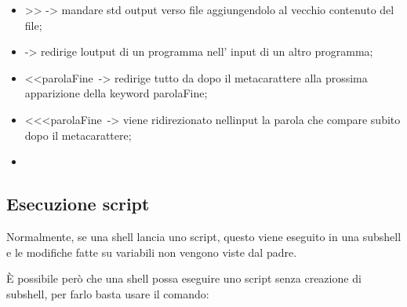 \documentclass[
]{article}
\providecommand{\tightlist}{%
  \setlength{\itemsep}{0pt}\setlength{\parskip}{0pt}}
\begin{document}
{}

\begin{itemize}
\tightlist
\item
  {\textgreater\textgreater{} }{-> mandare std output verso file
  aggiungendolo al vecchio contenuto del file;}
\end{itemize}

{}

\begin{itemize}
\tightlist
\item
  {\textbar{} }{-> redirige l\textquotesingle output di un programma
  nell' input di un altro programma;}
\end{itemize}

{}

\begin{itemize}
\tightlist
\item
  {\textless\textless{}}{parolaFine}{~}{-> redirige tutto da dopo il
  metacarattere alla prossima apparizione della keyword }{parolaFine}{;}
\end{itemize}

{}

\begin{itemize}
\tightlist
\item
  {\textless\textless\textless{}}{parolaFine}{~}{-> viene ridirezionato
  nell\textquotesingle input la parola che compare subito dopo il
  metacarattere;}
\end{itemize}

{}

\begin{itemize}
\tightlist
\item
  {}
\end{itemize}

{}

{}

{}

{}

\subsection{\texorpdfstring{{Esecuzione
script}}{Esecuzione script}}\label{h.msnbjeuypgoj}

{Normalmente, se una shell lancia uno script, questo viene eseguito in
una subshell e le modifiche fatte su variabili non vengono viste dal
padre.}

{È possibile però che una shell possa eseguire uno script senza
creazione di subshell, per farlo basta usare il comando:}
\end{document}
